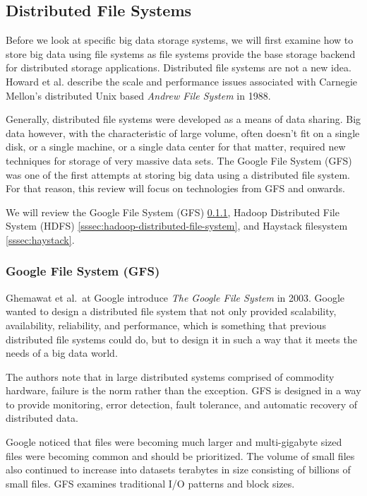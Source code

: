 \documentclass[]{article}
\begin{document}
\subsection{Distributed File Systems}\label{ssec:distributed-file-systems}
Before we look at specific big data storage systems, we will first examine how to store big data using file systems as file systems provide the base storage backend for distributed storage applications. Distributed file systems are not a new idea. Howard et al.\cite{howard_scale_1988} describe the scale and performance issues associated with Carnegie Mellon's distributed Unix based \textit{Andrew File System} in 1988. 

Generally, distributed file systems were developed as a means of data sharing. Big data however, with the characteristic of large volume, often doesn't fit on a single disk, or a single machine, or a  single data center for that matter, required new techniques for storage of very massive data sets. The Google File System (GFS) was one of the first attempts at storing big data using a distributed file system. For that reason, this review will focus on technologies from GFS and onwards. 

We will review the Google File System (GFS) \ref{sssec:google-file-system}, Hadoop Distributed File System (HDFS) \ref{sssec:hadoop-distributed-file-system}, and Haystack filesystem \ref{sssec:haystack}.

\subsubsection{Google File System (GFS)}\label{sssec:google-file-system}
Ghemawat et al.\ at Google introduce \textit{The Google File System}\cite{ghemawat_google_2003} in 2003. Google wanted to design a distributed file system that not only provided scalability, availability, reliability, and performance, which is something that previous distributed file systems could do, but to design it in such a way that it meets the needs of a big data world. 

The authors note that in large distributed systems comprised of commodity hardware, failure is the norm rather than the exception. GFS is designed in a way to provide monitoring, error detection, fault tolerance, and automatic recovery of distributed data. 

Google noticed that files were becoming much larger and multi-gigabyte sized files were becoming common and should be prioritized. The volume of small files also continued to increase into datasets terabytes in size consisting of billions of small files. GFS examines traditional I/O patterns and block sizes.
\end{document}
